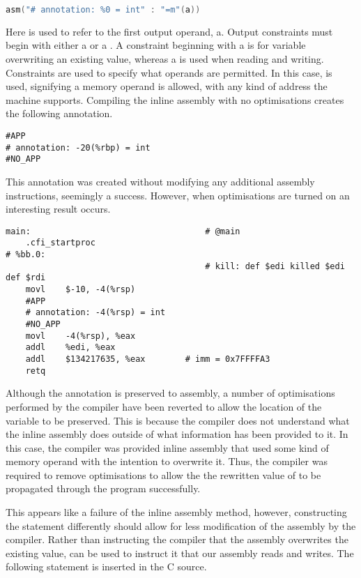 \begin{lstlisting}[language=C, numbers=none]
asm("# annotation: %0 = int" : "=m"(a))
\end{lstlisting}

Here  is used to refer to the first output operand, a. Output constraints must begin with either a  or a . A constraint beginning with a  is for variable overwriting an existing value, whereas a  is used when reading and writing. Constraints are used to specify what operands are permitted. In this case,  is used, signifying a memory operand is allowed, with any kind of address the machine supports. Compiling the inline assembly with no optimisations creates the following annotation.

\begin{lstlisting}[firstnumber=30, caption=variable-O0.s]
#APP
# annotation: -20(%rbp) = int
#NO_APP
\end{lstlisting}

This annotation was created without modifying any additional assembly instructions, seemingly a success. However, when optimisations are turned on an interesting result occurs.

\begin{lstlisting}[firstnumber=6, caption=variable-O3.s, label=lst:inlineVariableOutputOperand]
main:                                   # @main
	.cfi_startproc
# %bb.0:
                                        # kill: def $edi killed $edi def $rdi
	movl	$-10, -4(%rsp)
	#APP
	# annotation: -4(%rsp) = int
	#NO_APP
	movl	-4(%rsp), %eax
	addl	%edi, %eax
	addl	$134217635, %eax        # imm = 0x7FFFFA3
	retq
\end{lstlisting}

Although the annotation is preserved to assembly, a number of optimisations performed by the compiler have been reverted to allow the location of the variable  to be preserved. This is because the compiler does not understand what the inline assembly does outside of what information has been provided to it. In this case, the compiler was provided inline assembly that used some kind of memory operand with the intention to overwrite it. Thus, the compiler was required to remove optimisations to allow the the rewritten value of  to be propagated through the program successfully. 

This appears like a failure of the inline assembly method, however, constructing the statement differently should allow for less modification of the assembly by the compiler. Rather than instructing the compiler that the assembly overwrites the existing value,  can be used to instruct it that our assembly reads and writes. The following statement is inserted in the C source.

